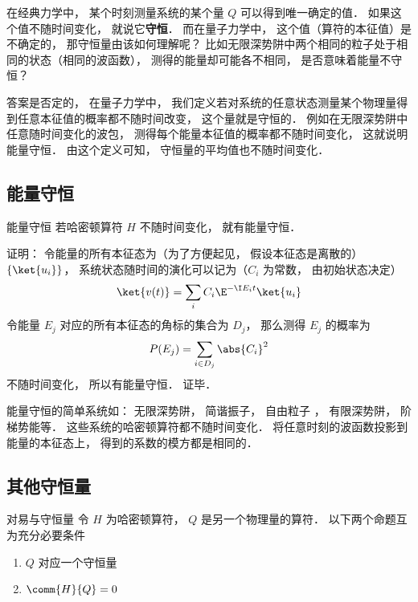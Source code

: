 

在经典力学中， 某个时刻测量系统的某个量 $Q$ 可以得到唯一确定的值． 如果这个值不随时间变化， 就说它\textbf{守恒}． 而在量子力学中， 这个值（算符的本征值）是不确定的， 那守恒量由该如何理解呢？ 比如无限深势阱中两个相同的粒子处于相同的状态（相同的波函数）， 测得的能量却可能各不相同， 是否意味着能量不守恒？

答案是否定的， 在量子力学中， 我们定义若对系统的任意状态测量某个物理量得到任意本征值的概率都不随时间改变， 这个量就是守恒的． 例如在无限深势阱中任意随时间变化的波包， 测得每个能量本征值的概率都不随时间变化， 这就说明能量守恒． 由这个定义可知， 守恒量的平均值也不随时间变化．

\subsection{能量守恒}

\begin{theorem}{能量守恒}
若哈密顿算符 $H$ 不随时间变化， 就有能量守恒．
\end{theorem}
证明： 令能量的所有本征态为（为了方便起见， 假设本征态是离散的） $\{\ket{u_i}\}$， 系统状态随时间的演化可以记为（$C_i$ 为常数， 由初始状态决定）
\begin{equation}
\ket{v(t)} = \sum_i C_i \E^{-\I E_i t} \ket{u_i}
\end{equation}
令能量 $E_j$ 对应的所有本征态的角标的集合为 $D_j$， 那么测得 $E_j$ 的概率为
\begin{equation}
P(E_j) = \sum_{i \in D_j} \abs{C_i}^2
\end{equation}
不随时间变化， 所以有能量守恒． 证毕．

\begin{example}{}
能量守恒的简单系统如： 无限深势阱， 简谐振子， 自由粒子%
， 有限深势阱， 阶梯势能等． 这些系统的哈密顿算符都不随时间变化． 将任意时刻的波函数投影到能量的本征态上， 得到的系数的模方都是相同的．
\end{example}

\subsection{其他守恒量}


\begin{theorem}{对易与守恒量}
令 $H$ 为哈密顿算符， $Q$ 是另一个物理量的算符． 以下两个命题互为充分必要条件
\begin{enumerate}
\item $Q$ 对应一个守恒量
\item $\comm{H}{Q} = 0$
\end{enumerate}
\end{theorem}


